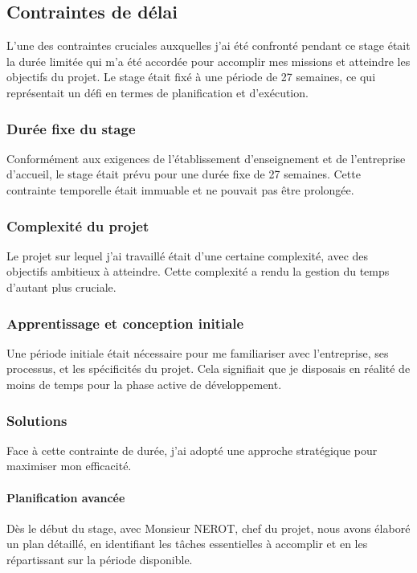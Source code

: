 \documentclass[a4paper, 12pt, french]{article}
\begin{document}
					\subsection{Contraintes de délai}
						L'une des contraintes cruciales auxquelles j'ai été confronté pendant ce stage était la durée limitée qui m'a été accordée pour accomplir mes missions et atteindre les objectifs du projet. Le stage était fixé à une période de 27 semaines, ce qui représentait un défi en termes de planification et d'exécution.\\

						\subsubsection{Durée fixe du stage}
							Conformément aux exigences de l'établissement d'enseignement et de l'entreprise d'accueil, le stage était prévu pour une durée fixe de 27 semaines. Cette contrainte temporelle était immuable et ne pouvait pas être prolongée.

						\subsubsection{Complexité du projet}
							Le projet sur lequel j'ai travaillé était d'une certaine complexité, avec des objectifs ambitieux à atteindre. Cette complexité a rendu la gestion du temps d'autant plus cruciale.

						\subsubsection{Apprentissage et conception initiale}
							Une période initiale était nécessaire pour me familiariser avec l'entreprise, ses processus, et les spécificités du projet. Cela signifiait que je disposais en réalité de moins de temps pour la phase active de développement.

						\subsubsection{Solutions}
							Face à cette contrainte de durée, j'ai adopté une approche stratégique pour maximiser mon efficacité.

							\paragraph{Planification avancée\\}
								Dès le début du stage, avec Monsieur NEROT, chef du projet, nous avons élaboré un plan détaillé, en identifiant les tâches essentielles à accomplir et en les répartissant sur la période disponible.
\end{document}
